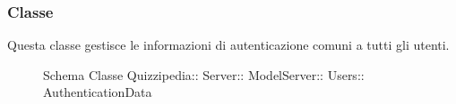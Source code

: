 \subsubsection{Classe }
Questa classe gestisce le informazioni di autenticazione comuni a tutti gli utenti.
\begin{figure}[H]
\centering
\noindent{}
\caption[Schema Classe AuthenticationData]{Schema Classe Quizzipedia:: Server:: ModelServer:: Users:: AuthenticationData}
\end{figure}
